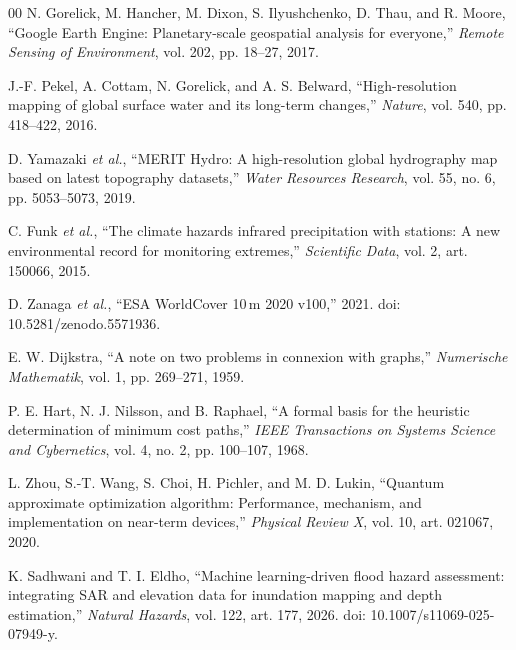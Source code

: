 \documentclass[conference]{IEEEtran}
\begin{document}
\begin{thebibliography}{00}
 N. Gorelick, M. Hancher, M. Dixon, S. Ilyushchenko, D. Thau, and R. Moore, ``Google Earth Engine: Planetary-scale geospatial analysis for everyone,'' \emph{Remote Sensing of Environment}, vol. 202, pp. 18--27, 2017.

 J.-F. Pekel, A. Cottam, N. Gorelick, and A. S. Belward, ``High-resolution mapping of global surface water and its long-term changes,'' \emph{Nature}, vol. 540, pp. 418--422, 2016.

 D. Yamazaki \emph{et al.}, ``MERIT Hydro: A high-resolution global hydrography map based on latest topography datasets,'' \emph{Water Resources Research}, vol. 55, no. 6, pp. 5053--5073, 2019.

 C. Funk \emph{et al.}, ``The climate hazards infrared precipitation with stations: A new environmental record for monitoring extremes,'' \emph{Scientific Data}, vol. 2, art. 150066, 2015.

 D. Zanaga \emph{et al.}, ``ESA WorldCover 10\,m 2020 v100,'' 2021. doi: 10.5281/zenodo.5571936.

 E. W. Dijkstra, ``A note on two problems in connexion with graphs,'' \emph{Numerische Mathematik}, vol. 1, pp. 269--271, 1959.

 P. E. Hart, N. J. Nilsson, and B. Raphael, ``A formal basis for the heuristic determination of minimum cost paths,'' \emph{IEEE Transactions on Systems Science and Cybernetics}, vol. 4, no. 2, pp. 100--107, 1968.

 L. Zhou, S.-T. Wang, S. Choi, H. Pichler, and M. D. Lukin, ``Quantum approximate optimization algorithm: Performance, mechanism, and implementation on near-term devices,'' \emph{Physical Review X}, vol. 10, art. 021067, 2020.

 K. Sadhwani and T. I. Eldho, ``Machine learning-driven flood hazard assessment: integrating SAR and elevation data for inundation mapping and depth estimation,'' \emph{Natural Hazards}, vol. 122, art. 177, 2026. doi: 10.1007/s11069-025-07949-y.

\end{thebibliography}
\end{document}
